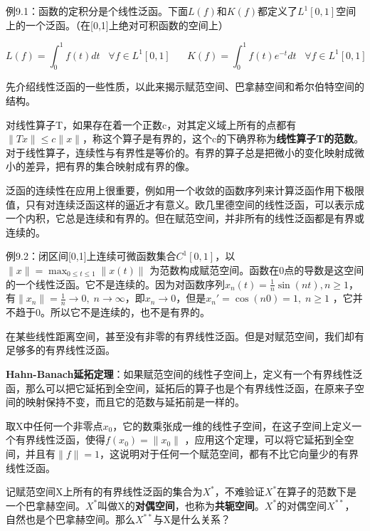 \kaishu\setlength{\leftskip}{1em}

例9.1：函数的定积分是个线性泛函。下面$ L(f) $和$ K(f) $都定义了$ L^1[0,1] $空间上的一个泛函。（在[0,1]上绝对可积函数的空间上）

\songti\setlength{\leftskip}{0em}
\begin{equation}
	L(f)= \int_0^1f(t)dt \;\;\; \forall f \in L^1[0,1] \;\;\;\;\;\;
	K(f)= \int_0^1f(t)e^{-t}dt \;\;\; \forall f \in L^1[0,1]
\end{equation}

先介绍线性泛函的一些性质，以此来揭示赋范空间、巴拿赫空间和希尔伯特空间的结构。

对线性算子T，如果存在着一个正数c，对其定义域上所有的点都有$ \|Tx\| \leq c\|x\| $，称这个算子是有界的，这个c的下确界称为\textbf{线性算子T的范数}。对于线性算子，连续性与有界性是等价的。有界的算子总是把微小的变化映射成微小的差异，把有界的集合映射成有界的像。

泛函的连续性在应用上很重要，例如用一个收敛的函数序列来计算泛函作用下极限值，只有对连续泛函这样的逼近才有意义。欧几里德空间的线性泛函，可以表示成一个内积，它总是连续和有界的。但在赋范空间，并非所有的线性泛函都是有界或连续的。

\kaishu\setlength{\leftskip}{1em}

例9.2：闭区间[0,1]上连续可微函数集合$ C^1[0,1] $，以$ \|x\| = \max_{0\leq t \leq 1} \|x(t)\| $ 为范数构成赋范空间。函数在0点的导数是这空间的一个线性泛函。它不是连续的。因为对函数序列$ x_n(t)=\frac{1}{n}\sin(nt),n\geq 1 $，有$ \|x_n\| = \frac{1}{n} \rightarrow 0, \; n \rightarrow \infty $，即$ x_n \rightarrow 0 $，但是$ {x_n}'=\cos(n0)=1, \; n \geq 1 $ ，它并不趋于0。所以它不是连续的，也不是有界的。

\songti\setlength{\leftskip}{0em}

在某些线性距离空间，甚至没有非零的有界线性泛函。但是对赋范空间，我们却有足够多的有界线性泛函。

\textbf{Hahn-Banach延拓定理}：如果赋范空间的线性子空间上，定义有一个有界线性泛函，那么可以把它延拓到全空间，延拓后的算子也是个有界线性泛函，在原来子空间的映射保持不变，而且它的范数与延拓前是一样的。

取X中任何一个非零点$ x_0 $，它的数乘张成一维的线性子空间，在这子空间上定义一个有界线性泛函，使得$ f(x_0)= \|x_0\| $ ，应用这个定理，可以将它延拓到全空间，并且有$ \|f\| =1 $，这说明对于任何一个赋范空间，都有不比它向量少的有界线性泛函。

记赋范空间X上所有的有界线性泛函的集合为$ X^* $，不难验证$ X^* $在算子的范数下是一个巴拿赫空间。$ X^* $叫做X的\textbf{对偶空间}，也称为\textbf{共轭空间}。$ X^* $的对偶空间$ X^{**} $，自然也是个巴拿赫空间。那么$ X^{**} $与X是什么关系？


